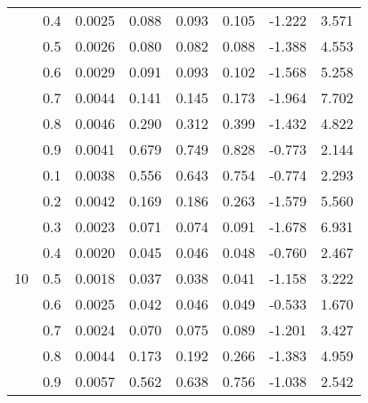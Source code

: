 \documentclass[11pt,a4paper]{report}
\begin{document}
\begin{longtable}{ | c | c || c | c | c | c | c | c | }
 & 0.4 & 0.0025 & 0.088 & 0.093 & 0.105 & -1.222 & 3.571 \\
 & 0.5 & 0.0026 & 0.080 & 0.082 & 0.088 & -1.388 & 4.553 \\
 & 0.6 & 0.0029 & 0.091 & 0.093 & 0.102 & -1.568 & 5.258 \\
 & 0.7 & 0.0044 & 0.141 & 0.145 & 0.173 & -1.964 & 7.702 \\
 & 0.8 & 0.0046 & 0.290 & 0.312 & 0.399 & -1.432 & 4.822 \\
 & 0.9 & 0.0041 & 0.679 & 0.749 & 0.828 & -0.773 & 2.144 \\
 \hline
\multirow{9}{*}{10} & 0.1 & 0.0038 & 0.556 & 0.643 & 0.754 & -0.774 & 2.293 \\
 & 0.2 & 0.0042 & 0.169 & 0.186 & 0.263 & -1.579 & 5.560 \\
 & 0.3 & 0.0023 & 0.071 & 0.074 & 0.091 & -1.678 & 6.931 \\
 & 0.4 & 0.0020 & 0.045 & 0.046 & 0.048 & -0.760 & 2.467 \\
 & 0.5 & 0.0018 & 0.037 & 0.038 & 0.041 & -1.158 & 3.222 \\
 & 0.6 & 0.0025 & 0.042 & 0.046 & 0.049 & -0.533 & 1.670 \\
 & 0.7 & 0.0024 & 0.070 & 0.075 & 0.089 & -1.201 & 3.427 \\
 & 0.8 & 0.0044 & 0.173 & 0.192 & 0.266 & -1.383 & 4.959 \\
 & 0.9 & 0.0057 & 0.562 & 0.638 & 0.756 & -1.038 & 2.542 \\
 \hline
\hline
\end{longtable}
\end{document}
